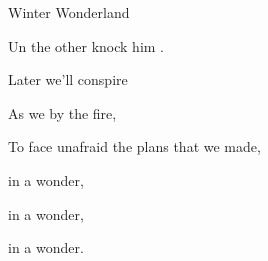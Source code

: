\begin{SBSong}{Winter Wonderland}
\begin{SBVerse}
    Un the other  knock him .
  \end{SBVerse}
  \begin{SBVerse}
    Later  we'll conspire
    
    As we  by the fire,
    
    To face unafraid the plans that we made,
    
     in a  wonder,
    
     in a  wonder,
 
     in a  wonder.    
  \end{SBVerse}
\end{SBSong}
